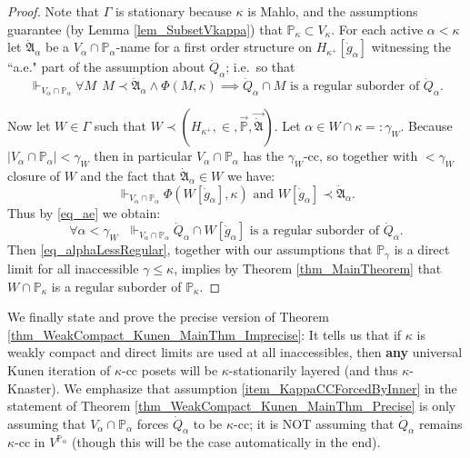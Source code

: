 \documentclass{amsart}
\begin{document}
\begin{proof}
Note that $\Gamma$ is stationary because $\kappa$ is Mahlo, and the assumptions guarantee (by Lemma \ref{lem_SubsetVkappa}) that $\mathbb{P}_\kappa \subset V_\kappa$.  For each active $\alpha < \kappa$ let $\dot{\mathfrak{A}}_\alpha$ be a $V_\alpha \cap \mathbb{P}_\alpha$-name for a first order structure on $H_{\kappa^+}[\dot{g}_\alpha]$ witnessing the ``a.e." part of the assumption about $\dot{Q}_\alpha$; i.e.\ so that
\begin{equation}\label{eq_ae}
\Vdash_{V_\alpha \cap \mathbb{P}_\alpha} \forall M  \ \ M \prec \dot{\mathfrak{A}}_\alpha \wedge \Phi(M,\kappa) \implies \dot{Q}_\alpha \cap M \text{ is a regular suborder of } \dot{Q}_\alpha.
\end{equation}

Now let $W \in \Gamma$ such that $W \prec (H_{\kappa^+}, \in, \vec{\mathbb{P}}, \vec{\dot{\mathfrak{A}}})$.  Let $\alpha \in W \cap \kappa =: \gamma_W$.  Because $|V_\alpha \cap \mathbb{P}_\alpha| < \gamma_W$ then in particular $V_\alpha \cap \mathbb{P}_\alpha$ has the $\gamma_W$-cc, so together with $<\gamma_W$ closure of $W$ and the fact that $\dot{\mathfrak{A}}_\alpha \in W$ we have:
\begin{equation*}
\Vdash_{V_\alpha \cap \mathbb{P}_\alpha}  \Phi(W[\dot{g}_\alpha], \kappa) \text{ and } W[\dot{g}_\alpha] \prec \dot{\mathfrak{A}}_\alpha.
\end{equation*}
Thus by \eqref{eq_ae} we obtain:
\begin{equation}\label{eq_alphaLessRegular}
\forall \alpha < \gamma_W \ \ \  \Vdash_{V_\alpha \cap \mathbb{P}_\alpha} \dot{Q}_\alpha \cap W[\dot{g}_\alpha] \text{ is a regular suborder of } \dot{Q}_\alpha.
\end{equation}
Then \eqref{eq_alphaLessRegular}, together with our assumptions that $\mathbb{P}_\gamma$ is a direct limit for all inaccessible $\gamma \le \kappa$, implies by Theorem \ref{thm_MainTheorem} that $W \cap \mathbb{P}_\kappa$ is a regular suborder of $\mathbb{P}_\kappa$.
\end{proof}


We finally state and prove the precise version of Theorem \ref{thm_WeakCompact_Kunen_MainThm_Imprecise}:
It tells us that if $\kappa$ is weakly compact and direct limits are used at all inaccessibles, then \textbf{any} universal Kunen iteration of $\kappa$-cc posets will be $\kappa$-stationarily layered (and thus $\kappa$-Knaster).  We emphasize that assumption \ref{item_KappaCCForcedByInner} in the statement of Theorem \ref{thm_WeakCompact_Kunen_MainThm_Precise} is only assuming that $V_\alpha \cap \mathbb{P}_\alpha$ forces $\dot{Q}_\alpha$ to be $\kappa$-cc; it is NOT assuming that $\dot{Q}_\alpha$ remains $\kappa$-cc in $V^{\mathbb{P}_\alpha}$ (though this will be the case automatically in the end).
\end{document}
